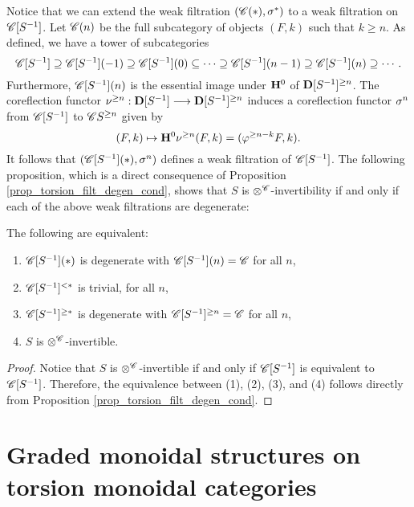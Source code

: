 Notice that we can extend the weak filtration $(\SGFilt{*}{\Cat{C}},
\sgHI{*})$ to a weak filtration on $\CatLoc{C}{S}$. Let 
$\SGFilt{n}{\Cat{C}}$ be the full subcategory of objects $(F, k)$ 
such that $k \geq n$. As defined, we have a tower of subcategories
\[
\CatLoc{C}{S} \supseteq \SGFilt{-1}{\CatLoc{C}{S}} \supseteq 
   \SGFilt{0}{\CatLoc{C}{S}} \subseteq \cdots \supseteq 
   \SGFilt{n - 1}{\CatLoc{C}{S}} 
   \supseteq \SGFilt{n}{\CatLoc{C}{S}} \supseteq \cdots.
\]
Furthermore, $\SGFilt{n}{\CatLoc{C}{S}}$ is the essential image 
under $\HH^0$ of $\Prerad{n}{\DCatLoc{S}}$. The coreflection functor
$\preradD{n}: \DCatLoc{S} \to \Prerad{n}{\DCatLoc{S}}$ induces a
coreflection functor $\sgHI{n}$ from $\CatLoc{C}{S}$ to 
$\Prerad{n}{\Cat{C}{S}}$ given by
\[
(F, k) \mapsto \HH^0\preradD{n}(F, k) = (\prerad{n - k}F, k).
\]
It follows that $(\SGFilt{*}{\CatLoc{C}{S}}, \sgHI{n})$ defines
a weak filtration of $\CatLoc{C}{S}$. The following proposition,
which is a direct consequence of Proposition
\ref{prop_torsion_filt_degen_cond}, shows that $S$ is 
$\tensor^{\Cat{C}}$-invertibility if and only if each of the
above weak filtrations are degenerate:

\begin{prop}
The following are equivalent:

\begin{enumerate}
\item $\SGFilt{*}{\CatLoc{C}{S}}$ is degenerate with 
$\SGFilt{n}{\CatLoc{C}{S}} = \Cat{C}$ for all $n$,

\item $\Corad{*}{\CatLoc{C}{S}}$ is trivial,
for all $n$,

\item $\Prerad{*}{\CatLoc{C}{S}}$ is degenerate with 
$\Prerad{n}{\CatLoc{C}{S}} = \Cat{C}$ for all $n$,

\item $S$ is $\tensor^{\Cat{C}}$-invertible.
\end{enumerate}
\end{prop}
\begin{proof}
Notice that $S$ is $\tensor^{\Cat{C}}$-invertible if and
only if $\CatLoc{C}{S}$ is equivalent to $\CatLoc{C}{S}$.
Therefore, the equivalence between (1), (2), (3), and (4)
follows directly from Proposition 
\ref{prop_torsion_filt_degen_cond}.
\end{proof}

\section{Graded monoidal structures on torsion monoidal categories}

